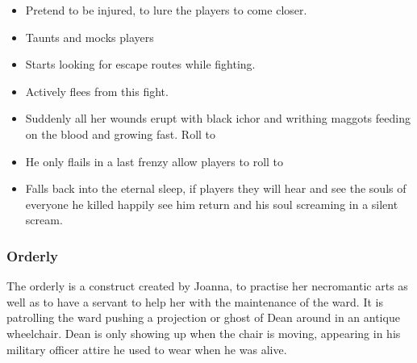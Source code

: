 \documentclass[bg-full]{resources/stylesheets/kult}
\begin{document}
\begin{itemize}[noitemsep]
  \item Pretend to be injured, to lure the players to come closer.
  \item Taunts and mocks players
  \item Starts looking for escape routes while fighting.
  \item Actively flees from this fight.
  \item Suddenly all her wounds erupt with black ichor and writhing maggots feeding on the blood and growing fast.  Roll to
  \item He only flails in a last frenzy allow players to roll  to 
  \item[\KULTgold{\skull}] Falls back into the eternal sleep, if players  they will
        hear and see the souls of everyone he killed happily see him return and his soul screaming in a silent scream.
\end{itemize}

\subsubsection{Orderly}%
\label{ssub:orderly}
The orderly is a construct created by Joanna, to practise her necromantic arts as well as to have a servant to help her with
the maintenance of the ward. It is patrolling the ward pushing a projection or ghost of Dean around in an antique wheelchair.
Dean is only showing up when the chair is moving, appearing in his military officer attire he used to wear when he was alive.
\end{document}
